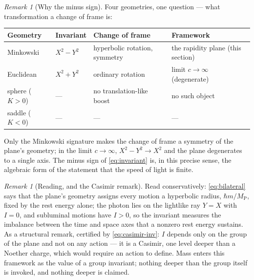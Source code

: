 \documentclass[11pt]{amsbook}
\theoremstyle{plain}
\theoremstyle{definition}
\theoremstyle{remark}
\newtheorem{remark}[theorem]{Remark}
\begin{document}
\begin{remark}[Why the minus sign]\label{rem:minus-sign}
Four geometries, one question --- what transformation a change of frame is:
\begin{center}
\begin{tabular}{@{}p{1.8cm}p{1.8cm}p{3.8cm}p{3.8cm}@{}}
\toprule
Geometry & Invariant & Change of frame & Framework \\
\midrule
Minkowski & $X^{2} - Y^{2}$ & hyperbolic rotation, symmetry & the rapidity plane (this section) \\
Euclidean & $X^{2} + Y^{2}$ & ordinary rotation & limit $c \to \infty$ (degenerate) \\
sphere ($K > 0$) & --- & no translation-like boost & no such object \\
saddle ($K < 0$) & --- & --- & --- \\
\bottomrule
\end{tabular}
\end{center}
Only the Minkowski signature makes the change of frame a symmetry of the plane's geometry; in the limit $c \to \infty$, $X^{2} - Y^{2} \to X^{2}$ and the plane degenerates to a single axis. The minus sign of \cref{eq:invariant} is, in this precise sense, the algebraic form of the statement that the speed of light is finite.
\end{remark}

\begin{remark}[Reading, and the Casimir remark]\label{rem:casimir}
Read conservatively: \cref{eq:bilateral} says that the plane's geometry assigns every motion a hyperbolic radius, $\hbar m/M_{\mathrm P}$, fixed by the rest energy alone; the photon lies on the lightlike ray $Y = X$ with $I = 0$, and subluminal motions have $I > 0$, so the invariant measures the imbalance between the time and space axes that a nonzero rest energy sustains. As a structural remark, certified by \cref{eq:casimir-inv}: $I$ depends only on the group of the plane and not on any action --- it is a Casimir, one level deeper than a Noether charge, which would require an action to define. Mass enters this framework as the value of a group invariant; nothing deeper than the group itself is invoked, and nothing deeper is claimed.
\end{remark}
\end{document}

